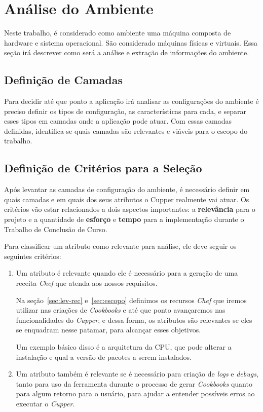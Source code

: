 \section{Análise do Ambiente}

Neste trabalho, é considerado como ambiente uma máquina composta
de hardware e sistema operacional. São considerado máquinas físicas
e virtuais. Essa seção irá descrever como será a análise e extração
de informações do ambiente.

\subsection{Definição de Camadas}

Para decidir até que ponto a aplicação irá analisar as configurações
do ambiente é preciso definir os tipos de configuração, as características para
cada, e separar esses tipos em camadas onde a aplicação pode atuar.
Com essas camadas definidas, identifica-se quais camadas são relevantes e viáveis
para o escopo do trabalho.


\subsection{Definição de Critérios para a Seleção}
\label{sec:defcritcamada}
Após levantar as camadas de configuração do ambiente, é necessário definir em
quais camadas e em quais dos seus atributos o Cupper realmente vai atuar. 
Os critérios vão estar relacionados a dois aspectos importantes: a \textbf{relevância} 
para o projeto e a quantidade de \textbf{esforço} e \textbf{tempo} para a implementação durante
o Trabalho de Conclusão de Curso.

Para classificar um atributo como relevante para análise, ele deve seguir os
seguintes critérios:

\begin{enumerate}
\item Um atributo é relevante quando ele é necessário para a geração de uma
receita \textit{Chef} que atenda aos nossos requisitos. 

Na seção~\ref{sec:lev-rec} e~\ref{sec:escopo} definimos os recursos \textit{Chef}
que iremos utilizar nas criações de \textit{Cookbooks} e até que ponto 
avançaremos nas funcionalidades do \textit{Cupper}, e dessa forma, os atributos
são relevantes se eles se enquadram nesse patamar, para alcançar esses objetivos.

Um exemplo básico disso é a arquitetura da CPU, que pode alterar a instalação
e qual a versão de pacotes a serem instalados.

\item Um atributo também é relevante se é necessário para criação de \textit{logs} 
e \textit{debugs}, tanto para uso da ferramenta durante o processo de gerar 
\textit{Cookbooks} quanto para algum retorno para o usuário, para ajudar 
a entender possíveis erros ao executar
o \textit{Cupper}.
\end{enumerate}

